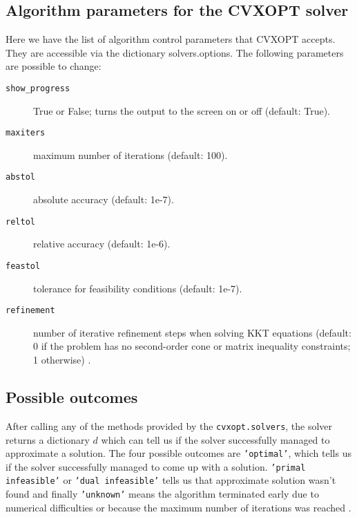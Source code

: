 \subsection{Algorithm parameters for the CVXOPT solver}
\label{algopara}

Here we have the list of algorithm control parameters that CVXOPT accepts. They are accessible via the dictionary solvers.options. 
The following parameters are possible to change:

\begin{description}
\item[\texttt{show\_progress}]
    True or False; turns the output to the screen on or off (default: True).
\item[\texttt{maxiters}]
    maximum number of iterations (default: 100).
\item[\texttt{abstol}]
    absolute accuracy (default: 1e-7).
\item[\texttt{reltol}]
    relative accuracy (default: 1e-6).
\item[\texttt{feastol}]
    tolerance for feasibility conditions (default: 1e-7).
\item[\texttt{refinement}]
    number of iterative refinement steps when solving KKT equations (default: 0 if the problem has no second-order cone or matrix inequality constraints; 1 otherwise) \cite{cvxoptuserpara}.
\end{description}


\subsection{Possible outcomes}
\label{outcomes}
After calling any of the methods provided by the \texttt{cvxopt.solvers}, the solver returns a dictionary $d$ which can tell us if the solver successfully managed to approximate a solution. The four possible outcomes are \texttt{'optimal'}, which tells us if the solver successfully managed to come up with a solution. \texttt{'primal infeasible'} or \texttt{'dual infeasible'} tells us that approximate solution wasn't found and finally \texttt{'unknown'}  means the algorithm terminated early due to numerical difficulties or because the maximum number of iterations was reached \cite{cvxoptuser}.
